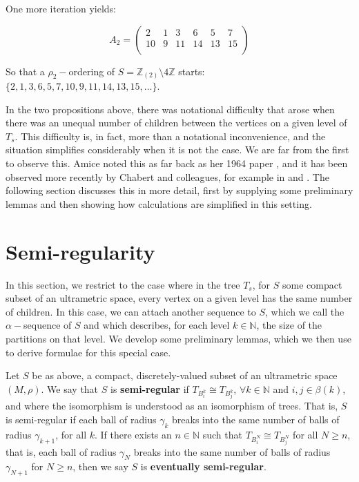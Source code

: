 \begin{example}
One more iteration yields:

\[A_2=
 \begin{pmatrix}
2 & 1 & 3 & 6 & 5 & 7 \\
10 & 9 & 11 & 14 & 13 & 15   \\
\end{pmatrix}
\]

So that a $\rho_2-$ordering of $S=\mathbb{Z}_{(2)} \setminus 4\mathbb{Z}$ starts: $\{2,1,3,6,5,7,10,9,11,14,13,15,\ldots\}$.

\end{example}


In the two propositions above, there was notational difficulty that arose when there was an unequal number of children between the vertices on a given level of $T_s$. This difficulty is, in fact, more than a notational inconvenience, and the situation simplifies considerably when it is not the case. We are far from the first to observe this. Amice noted this as far back as her 1964 paper \cite{amice}, and it has been observed more recently by Chabert and colleagues, for example in \cite{fp} and \cite{cef}. The following section discusses this in more detail, first by supplying some preliminary lemmas and then showing how calculations are simplified in this setting.\\

\section*{Semi-regularity}
In this section, we restrict to the case where in the tree $T_s$, for $S$ some compact subset of an ultrametric space, every vertex on a given level has the same number of children. In this case, we can attach another sequence to $S$, which we call the $\alpha-$sequence of $S$ and which describes, for each level $k \in \mathbb{N}$, the size of the partitions on that level. We develop some preliminary lemmas, which we then use to derive formulae for this special case.

\begin{definition}
Let $S$ be as above, a compact, discretely-valued subset of an ultrametric space $(M, \rho)$. We say that $S$ is \textbf{semi-regular} if $T_{B^k_i} \cong T_{B^k_j}$, $\forall k \in \mathbb{N}$ and  $i,j \in \beta(k)$, and where the isomorphism is understood as an isomorphism of trees. That is, $S$ is semi-regular if each ball of radius $\gamma_k$ breaks into the same number of balls of radius $\gamma_{k+1}$, for all $k$. If there exists an $n \in \mathbb{N}$ such that $T_{B^N_i} \cong T_{B^N_j}$ for all $N \geq n$, that is,  each ball of radius $\gamma_N$ breaks into the same number of balls of radius $\gamma_{N+1}$ for $N \geq n$, then we say $S$ is \textbf{eventually semi-regular}.
\end{definition}

